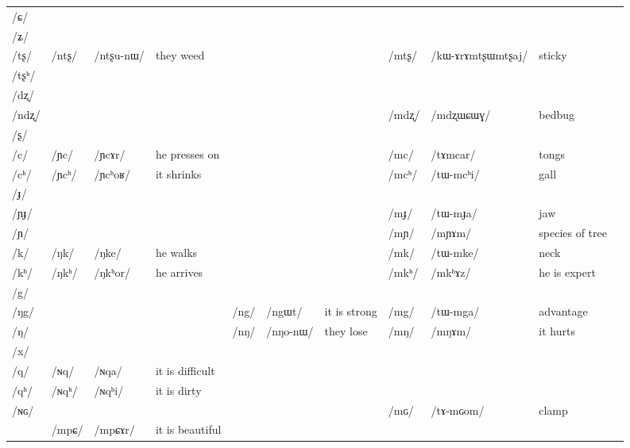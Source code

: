 \documentclass[oneside,a4paper,11pt]{article}
\newcommand{\ipa}[1]{\mbox{\phon/#1/}}
\newcommand{\deux}[1]{\ipa{#1}\addtocounter{2clusters}{1}}
\newcommand{\trois}[1]{\ipa{#1}\addtocounter{3clusters}{1}}
\begin{document}
\begin{landscape}
\begin{table}
\end{table}
 \begin{table}
\begin{tabular}{l|lll|lll|lll|l}
\toprule
\ipa{ɕ} 	& 	& 	& 	& 	& 	& 	& 	& 	&  \\
\ipa{ʑ} 	& 	& 	& 	& 	& 	& 	& 	& 	&  \\
\ipa{tʂ} 	& \deux{ntʂ} 	& \ipa{ntʂu-nɯ} 	& they weed 	& 	& 	& 	& \deux{mtʂ} 	& \ipa{kɯ-ɤrɤmtʂɯmtʂaj} 	& sticky \\
\ipa{tʂʰ} 	& 	& 	& 	& 	& 	& 	& 	& 	&  \\
\ipa{dʐ} 	& 	& 	& 	& 	& 	& 	& 	& 	&  \\
\ipa{ndʐ} 	& 	& 	& 	& 	& 	& 	& \deux{mdʐ} 	& \ipa{mdʐɯɕɯɣ} 	& bedbug \\
\ipa{ʂ} 	& 	& 	& 	& 	& 	& 	& 	& 	&  \\
\ipa{c} 	& \deux{ɲc} 	& \ipa{ɲcɤr} 	& he presses on	& 	& 	& 	& \deux{mc} 	& \ipa{tɤmcar} 	& tongs \\
\ipa{cʰ} 	& \deux{ɲcʰ} 	& \ipa{ɲcʰoʁ} 	& it shrinks	& 	& 	& 	& \deux{mcʰ} 	& \ipa{tɯ-mcʰi} 	& gall \\
\ipa{ɟ} 	& 	& 	& 	& 	& 	& 	& 	& 	&  \\
\ipa{ɲɟ} 	& 	& 	& 	& 	& 	& 	& \deux{mɟ} 	& \ipa{tɯ-mɟa} 	& jaw \\
\ipa{ɲ} 	& 	& 	& 	& 	& 	& 	& \deux{mɲ} 	& \ipa{mɲɤm} 	& species of tree \\
\ipa{k} 	& \deux{ŋk} 	& \ipa{ŋke} 	& he walks	& 	& 	& 	& \deux{mk} 	& \ipa{tɯ-mke} 	& neck \\
\ipa{kʰ} 	& \deux{ŋkʰ} 	& \ipa{ŋkʰor} 	&he arrives 	& 	& 	& 	& \deux{mkʰ} 	& \ipa{mkʰɤz} 	&he is expert  \\
\ipa{g} 	& 	& 	& 	& 	& 	& 	& 	& 	&  \\
\ipa{ŋg} 	& 	& 	& 	& \deux{ng} 	& \ipa{ngɯt} 	&it is strong 	& \deux{mg} 	& \ipa{tɯ-mga} 	& advantage \\
\ipa{ŋ} 	& 	& 	& 	& \deux{nŋ} 	& \ipa{nŋo-nɯ} 	& they lose	& \deux{mŋ} 	& \ipa{mŋɤm} 	& it hurts \\
\ipa{x} 	& 	& 	& 	& 	& 	& 	& 	& 	&  \\
\ipa{q} 	&   \deux{ɴq} 	& \ipa{ɴqa} 	& it is difficult	& 	&  	&	&	&	&\\
\ipa{qʰ}   	&   \deux{ɴqʰ} 	& \ipa{ɴqʰi} 	& it is dirty	& 	&	& 	& 	& 	&\\
\ipa{ɴɢ}  	& 	&	&	& 	& 	& 	& \deux{mɢ} 	& \ipa{tɤ-mɢom} 	&clamp  \\
\midrule
&\trois{mpɕ} &\ipa{mpɕɤr} & it is beautiful\\
\bottomrule
\end{tabular}%
\end{table}
\end{landscape}
\end{document}
